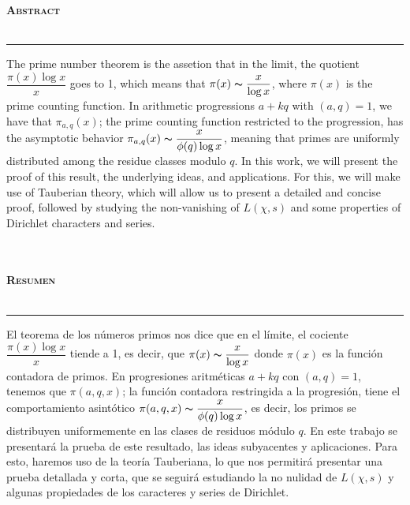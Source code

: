 
\thispagestyle{empty}
\vspace*{4cm}
\begin{Huge}
    \bfseries \selectfont \hfill \scshape Abstract\\\\
    \rule[0.5ex]{\linewidth}{1pt}
\end{Huge}

The prime number theorem is the assetion that in the limit, the quotient $\dfrac{\pi(x)\log x}{x}$ goes to 1, which means that $\pi(x)\thicksim \dfrac{x}{\log x}$, where $\pi(x)$ is the prime counting function. In arithmetic progressions $a+kq$ with $(a,q)=1$, we have that $\pi_{a,q}(x)$; the prime counting function restricted to the progression, has the asymptotic behavior $\pi_{a,q}(x)\thicksim \dfrac{x}{\phi(q)\log x}$, meaning that primes are uniformly distributed among the residue classes modulo $q$. In this work, we will present the proof of this result, the underlying ideas, and applications. For this, we will make use of Tauberian theory, which will allow us to present a detailed and concise proof, followed by studying the non-vanishing of $L(\chi,s)$ and some properties of Dirichlet characters and series.\\\\\\

\begin{Huge}
    \bfseries \selectfont \scshape Resumen\\\\
    \rule[0.5ex]{\linewidth}{1pt}
\end{Huge}

El teorema de los números primos nos dice que en el límite, el cociente $\dfrac{\pi(x)\log x}{x}$ tiende a 1, es decir, que $\pi(x)\thicksim \dfrac{x}{\log x}$ donde $\pi(x)$ es la función contadora de primos. En progresiones aritméticas $a+kq$ con $(a,q)=1$, tenemos que $\pi(a,q,x)$; la función contadora restringida a la progresión, tiene el comportamiento asintótico $\pi(a,q,x)\thicksim \dfrac{x}{\phi(q)\log x}$, es decir, los primos se distribuyen uniformemente en las clases de residuos módulo $q$. En este trabajo se presentará la prueba de este resultado, las ideas subyacentes y aplicaciones. Para esto, haremos uso de la teoría Tauberiana, lo que nos permitirá presentar una prueba detallada y corta, que se seguirá estudiando la no nulidad de $L(\chi,s)$ y algunas propiedades de los caracteres y series de Dirichlet.